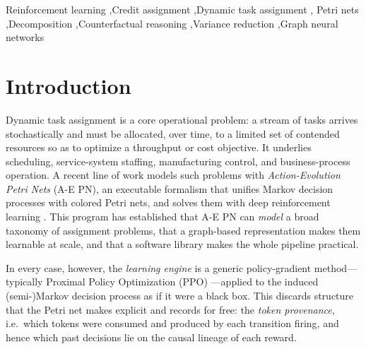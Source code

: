 \documentclass[review,authoryear,3p,times]{elsarticle}
\begin{document}
\begin{frontmatter}
\begin{abstract}
honest null both mechanisms predict on a genuinely single-component
bottleneck can be closed by any other provenance- or structure-exploiting
route, and rule out three independently-motivated candidates with proofs
rather than single discouraging runs: potential-based reward shaping (safe by
theorem, empirically counter-productive at practical budgets), static
structural input features (provably redundant given the network's existing
action-type encoding), and a previously undocumented graph-actor
architecture blind spot, which we prove is real via exact-invariance under
an untrained network, fix, and show still does not move the bottleneck. This
precisely localizes the bottleneck's remaining difficulty away from credit
assignment and observability---a decision rule for practitioners as much as
a technical result.
\end{abstract}

\begin{keyword}
Reinforcement learning \sep Credit assignment \sep Dynamic task assignment \sep
Petri nets \sep Decomposition \sep Counterfactual reasoning \sep Variance
reduction \sep Graph neural networks
\end{keyword}

\end{frontmatter}

\section{Introduction}
\label{sec:intro}

Dynamic task assignment is a core operational problem: a stream of tasks arrives
stochastically and must be allocated, over time, to a limited set of contended
resources so as to optimize a throughput or cost objective. It underlies
scheduling, service-system staffing, manufacturing control, and business-process
operation. A recent line of work models such problems with \emph{Action-Evolution
Petri Nets} (A-E PN), an executable formalism that unifies Markov decision
processes with colored Petri nets, and solves them with deep reinforcement
learning \citep{aepn2023,aepn_repr2025,gympn2025}. This program has established
that A-E PN can \emph{model} a broad taxonomy of assignment problems, that a
graph-based representation makes them learnable at scale, and that a software
library makes the whole pipeline practical.

In every case, however, the \emph{learning engine} is a generic policy-gradient
method---typically Proximal Policy Optimization (PPO) \citep{ppo2017}---applied
to the induced (semi-)Markov decision process as if it were a black box. This
discards structure that the Petri net makes explicit and records for free: the
\emph{token provenance}, i.e.\ which tokens were consumed and produced by each
transition firing, and hence which past decisions lie on the causal lineage of
each reward.
\end{document}
